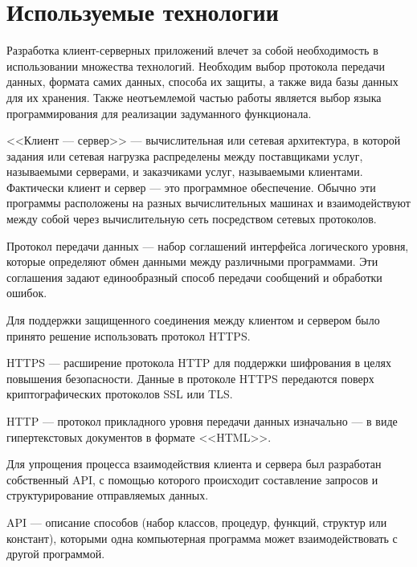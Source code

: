 \clearpage
\section{Используемые технологии}
Разработка клиент-серверных приложений влечет за собой необходимость в использовании множества технологий.
Необходим выбор протокола передачи данных, формата самих данных, способа их защиты, а также вида базы данных для их хранения.
Также неотъемлемой частью работы является выбор языка программирования для реализации задуманного функционала.

\begin{definition}
    <<Клиент --- сервер>> --- вычислительная или сетевая архитектура, в которой задания или сетевая нагрузка распределены между поставщиками услуг,
    называемыми серверами, и заказчиками услуг, называемыми клиентами. Фактически клиент и сервер --- это программное обеспечение.
    Обычно эти программы расположены на разных вычислительных машинах и взаимодействуют между собой через вычислительную сеть посредством сетевых протоколов.
\end{definition}

\begin{definition}
    Протокол передачи данных --- набор соглашений интерфейса логического уровня, которые определяют обмен данными между различными программами.
    Эти соглашения задают единообразный способ передачи сообщений и обработки ошибок.
\end{definition}

Для поддержки защищенного соединения между клиентом и сервером было принято решение использовать протокол HTTPS.
\begin{definition}
    HTTPS --- расширение протокола HTTP для поддержки шифрования в целях повышения безопасности.
    Данные в протоколе HTTPS передаются поверх криптографических протоколов SSL или TLS.
\end{definition}

\begin{definition}
    HTTP --- протокол прикладного уровня передачи данных изначально --- в виде гипертекстовых документов в формате <<HTML>>.
\end{definition}

Для упрощения процесса взаимодействия клиента и сервера был разработан собственный API,
с помощью которого происходит составление запросов и структурирование отправляемых данных.
\begin{definition}
    API --- описание способов (набор классов, процедур, функций, структур или констант),
    которыми одна компьютерная программа может взаимодействовать с другой программой.
\end{definition}

